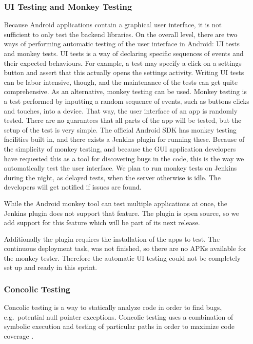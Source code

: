 \subsubsection{UI Testing and Monkey Testing}
Because Android applications contain a graphical user interface, it is not sufficient to only test the backend libraries. On the overall level, there are two ways of performing automatic testing of the user interface in Android: UI tests and monkey tests. UI tests is a way of declaring specific sequences of events and their expected behaviours. For example, a test may specify a click on a settings button and assert that this actually opens the settings activity. Writing UI tests can be labor intensive, though, and the maintenance of the tests can get quite comprehensive. As an alternative, monkey testing can be used. Monkey testing is a test performed by inputting a random sequence of events, such as buttons clicks and touches, into a device. That way, the user interface of an app is randomly tested. There are no guarantees that all parts of the app will be tested, but the setup of the test is very simple. The official Android SDK has monkey testing facilities built in, and there exists a Jenkins plugin for running these. Because of the simplicity of monkey testing, and because the GUI application developers have requested this as a tool for discovering bugs in the code, this is the way we automatically test the user interface. We plan to run monkey tests on Jenkins during the night, as delayed tests, when the server otherwise is idle. The developers will get notified if issues are found.

While the Android monkey tool can test multiple applications at once, the Jenkins plugin does not support that feature. The plugin is open source, so we add support for this feature which will be part of its next release.

Additionally the plugin requires the installation of the apps to test. The continuous deployment task, was not finished, so there are no APKs available for the monkey tester. Therefore the automatic UI testing could not be completely set up and ready in this sprint.  

\subsubsection{Concolic Testing}
Concolic testing is a way to statically analyze code in order to find bugs, e.g.\ potential null pointer exceptions. Concolic testing uses a combination of symbolic execution and testing of particular paths in order to maximize code coverage \parencite{concolic_testing_2015}.

